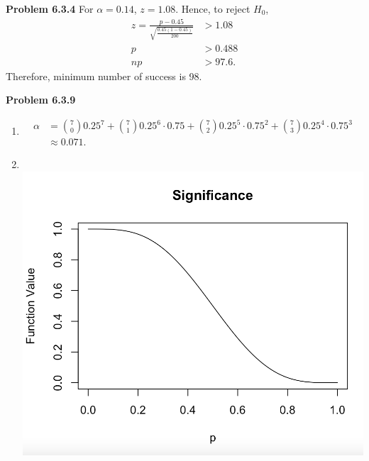 \documentclass{article}
\begin{document}
\textbf{Problem 6.3.4}
For $\alpha = 0.14$, $z = 1.08$.
Hence, to reject $H_0$,
\begin{align*}
    z = \frac{p-0.45}{\sqrt{\frac{0.45(1-0.45)}{200}}} & > 1.08 \\
    p & > 0.488 \\
    np & > 97.6.
\end{align*}
Therefore, minimum number of success is 98.
\bigbreak


\textbf{Problem 6.3.9}
\begin{enumerate}[label={(\alph*)}]
    \item
    \begin{align*}
        \alpha & = {7\choose 0}0.25^7 + {7\choose 1}0.25^6\cdot 0.75 + {7\choose 2}0.25^5\cdot 0.75^2 + {7\choose 3}0.25^4\cdot 0.75^3 \\
        & \approx 0.071.
    \end{align*}
    
    \item \indent \\
    \includegraphics{graph.png}
\end{enumerate}
\bigbreak
\end{document}
